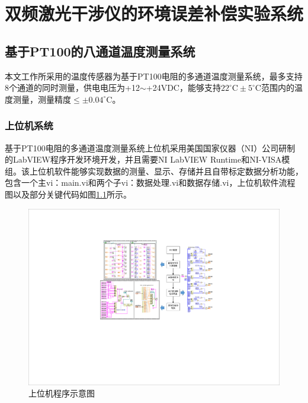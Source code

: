 \chapter{双频激光干涉仪的环境误差补偿实验系统}
\section{基于PT100的八通道温度测量系统}
本文工作所采用的温度传感器为基于PT100电阻的多通道温度测量系统，最多支持8个通道的同时测量，供电电压为+12$\sim$+24VDC，能够支持\(22^{\circ} \mathrm{C} \pm 5^{\circ} \mathrm{C}\)范围内的温度测量，测量精度\(\leq \pm 0.04^{\circ} \mathrm{C}\)。

\subsection{上位机系统}
基于PT100电阻的多通道温度测量系统上位机采用美国国家仪器（NI）公司研制的LabVIEW程序开发环境开发，并且需要NI LabVIEW Runtime和NI-VISA模组。该上位机软件能够实现数据的测量、显示、存储并且自带标定数据分析功能，包含一个主vi：main.vi和两个子vi：数据处理.vi和数据存储.vi，上位机软件流程图以及部分关键代码如图\ref{fig:上位机程序示意图}所示。
\begin{figure}[htb]
    \centering
    \includegraphics[width=14cm]{fig/3-fig/上位机程序示意图.pdf}
    \caption{上位机程序示意图}
    \label{fig:上位机程序示意图}
\end{figure}

